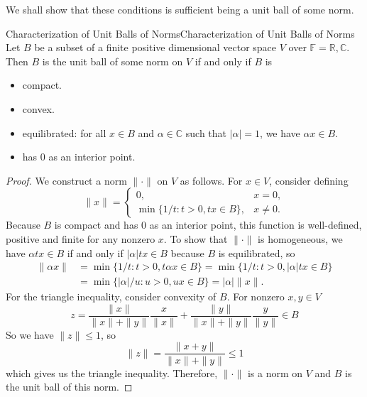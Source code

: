 \documentclass[../main.tex]{subfiles}
\begin{document}
We shall show that these conditions is sufficient being a unit ball of some norm.
\begin{theorem}{Characterization of Unit Balls of Norms}{Characterization of Unit Balls of Norms}
  Let $B$ be a subset of a finite positive dimensional vector space $V$ over $\mathbb{F} = \mathbb{R}, \mathbb{C}$. Then $B$ is the unit ball of some norm on $V$ if and only if $B$ is
  \begin{itemize}
    \item compact.
    \item convex.
    \item equilibrated: for all $x \in B$ and $\alpha \in \mathbb{C}$ such that $|\alpha| = 1$, we have $\alpha x \in B$.
    \item has $0$ as an interior point.
  \end{itemize}
\end{theorem}
\begin{proof}
  We construct a norm $\|\cdot\|$ on $V$ as follows. For $x \in V$, consider defining
  \begin{equation*}
    \|x\| = 
    \begin{cases}
      0, & x = 0, \\
      \min \{1 / t: t > 0, tx \in B\}, & x \neq 0.
    \end{cases}
  \end{equation*}
  Because $B$ is compact and has $0$ as an interior point, this function is well-defined, positive and finite for any nonzero $x$. To show that $\|\cdot\|$ is homogeneous, we have $\alpha t x \in B$ if and only if $|\alpha| t x \in B$ because $B$ is equilibrated, so
  \begin{equation*}
    \begin{aligned}
      \|\alpha x\| &= \min \{1 / t: t > 0, t \alpha x \in B\} = \min \{1 / t: t > 0, |\alpha| t x \in B\}\\
      &= \min \{ |\alpha| / u: u > 0, u x \in B\} = |\alpha| \|x\|.
    \end{aligned}
  \end{equation*}
  For the triangle inequality, consider convexity of $B$. For nonzero $x,y \in V$
  \begin{equation*}
    z = \frac{\|x\|}{\|x\| + \|y\|} \frac{x}{\|x\|} + \frac{\|y\|}{\|x\| + \|y\|} \frac{y}{\|y\|} \in B
  \end{equation*}
  So we have $\|z\| \leq 1$, so
  \begin{equation*}
    \|z\| = \frac{\|x + y\|}{\|x\| + \|y\|} \leq 1
  \end{equation*}
  which gives us the triangle inequality. Therefore, $\|\cdot\|$ is a norm on $V$ and $B$ is the unit ball of this norm.
\end{proof}
\end{document}
